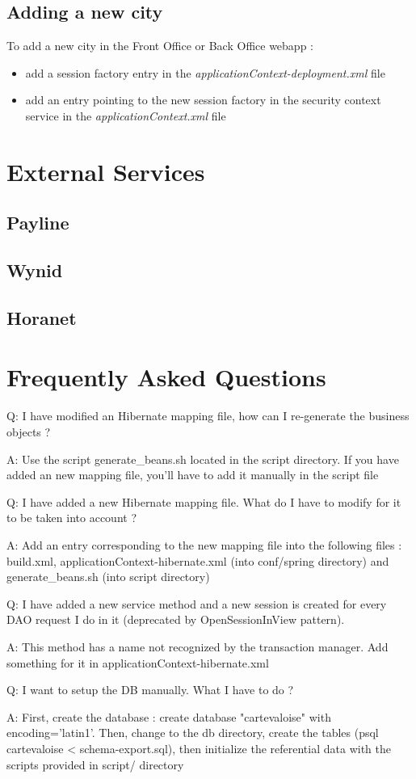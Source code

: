 \documentclass[11pt,a4paper]{report}
\begin{document}
\section{Adding a new city}
To add a new city in the Front Office or Back Office webapp :
\begin{itemize}
  \item add a session factory entry in the
  \emph{applicationContext-deployment.xml} file
  \item add an entry pointing to the new session factory in the security context
  service in the \emph{applicationContext.xml} file
\end{itemize}

\chapter{External Services}

\section{Payline}

\section{Wynid}

\section{Horanet}

\chapter{Frequently Asked Questions}

Q: I have modified an Hibernate mapping file, how can I re-generate the
   business objects ?

A: Use the script generate_beans.sh located in the script
   directory. If you have added an new mapping file, you'll have to add
   it manually in the script file

Q: I have added a new Hibernate mapping file. What do I have to modify
   for it to be taken into account ?

A: Add an entry corresponding to the new mapping file into the
   following files : build.xml, applicationContext-hibernate.xml (into
   conf/spring directory) and generate_beans.sh (into script directory)

Q: I have added a new service method and a new session is created for
   every DAO request I do in it (deprecated by OpenSessionInView pattern).

A: This method has a name not recognized by the transaction
   manager. Add something for it in applicationContext-hibernate.xml

Q: I want to setup the DB manually. What I have to do ?

A: First, create the database : create database "cartevaloise" with
   encoding='latin1'. Then, change to the db directory, create the tables
   (psql cartevaloise < schema-export.sql), then initialize the
   referential data with the scripts provided in script/ directory
\end{document}
